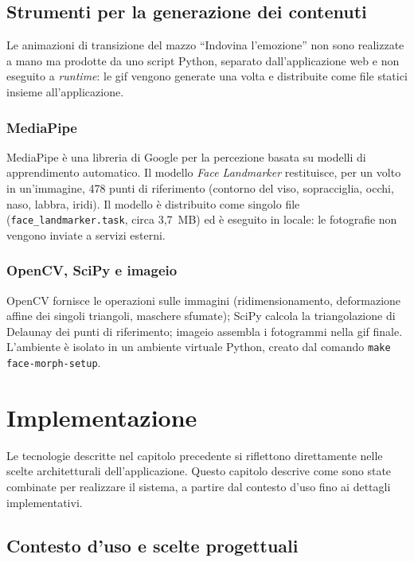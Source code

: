 \documentclass[12pt]{report}
\begin{document}
\section{Strumenti per la generazione dei contenuti}

Le animazioni di transizione del mazzo ``Indovina l'emozione'' non sono realizzate a mano ma prodotte da uno script Python, separato dall'applicazione web e non eseguito a \textit{runtime}: le gif vengono generate una volta e distribuite come file statici insieme all'applicazione.

\subsection{MediaPipe}
MediaPipe è una libreria di Google per la percezione basata su modelli di apprendimento automatico. Il modello \textit{Face Landmarker} restituisce, per un volto in un'immagine, 478 punti di riferimento (contorno del viso, sopracciglia, occhi, naso, labbra, iridi). Il modello è distribuito come singolo file (\texttt{face\_landmarker.task}, circa 3,7~MB) ed è eseguito in locale: le fotografie non vengono inviate a servizi esterni.

\subsection{OpenCV, SciPy e imageio}
OpenCV fornisce le operazioni sulle immagini (ridimensionamento, deformazione affine dei singoli triangoli, maschere sfumate); SciPy calcola la triangolazione di Delaunay dei punti di riferimento; imageio assembla i fotogrammi nella gif finale. L'ambiente è isolato in un ambiente virtuale Python, creato dal comando \texttt{make face-morph-setup}.

%
%

\chapter{Implementazione}
\label{cap:implementazione}

Le tecnologie descritte nel capitolo precedente si riflettono direttamente nelle scelte architetturali dell'applicazione. Questo capitolo descrive come sono state combinate per realizzare il sistema, a partire dal contesto d'uso fino ai dettagli implementativi.

\section{Contesto d'uso e scelte progettuali}
\label{sec:contesto}
\end{document}
